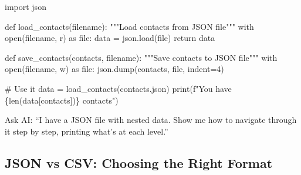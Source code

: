 \documentclass[
  letterpaper,
  DIV=11,
  numbers=noendperiod,
  oneside]{scrreprt}
\newenvironment{Shaded}{}{}
\newcommand{\BuiltInTok}[1]{\textcolor[rgb]{0.84,0.23,0.29}{#1}}
\newcommand{\CommentTok}[1]{\textcolor[rgb]{0.42,0.45,0.49}{#1}}
\newcommand{\ControlFlowTok}[1]{\textcolor[rgb]{0.84,0.23,0.29}{#1}}
\newcommand{\DecValTok}[1]{\textcolor[rgb]{0.00,0.36,0.77}{#1}}
\newcommand{\ImportTok}[1]{\textcolor[rgb]{0.01,0.18,0.38}{#1}}
\newcommand{\KeywordTok}[1]{\textcolor[rgb]{0.84,0.23,0.29}{#1}}
\newcommand{\NormalTok}[1]{\textcolor[rgb]{0.14,0.16,0.18}{#1}}
\newcommand{\OperatorTok}[1]{\textcolor[rgb]{0.14,0.16,0.18}{#1}}
\newcommand{\SpecialCharTok}[1]{\textcolor[rgb]{0.00,0.36,0.77}{#1}}
\newcommand{\SpecialStringTok}[1]{\textcolor[rgb]{0.01,0.18,0.38}{#1}}
\newcommand{\StringTok}[1]{\textcolor[rgb]{0.01,0.18,0.38}{#1}}
\begin{document}
\begin{Shaded}
\begin{Highlighting}[]
\ImportTok{import}\NormalTok{ json}

\KeywordTok{def}\NormalTok{ load\_contacts(filename):}
    \CommentTok{"""Load contacts from JSON file"""}
    \ControlFlowTok{with} \BuiltInTok{open}\NormalTok{(filename, }\StringTok{\textquotesingle{}r\textquotesingle{}}\NormalTok{) }\ImportTok{as} \BuiltInTok{file}\NormalTok{:}
\NormalTok{        data }\OperatorTok{=}\NormalTok{ json.load(}\BuiltInTok{file}\NormalTok{)}
    \ControlFlowTok{return}\NormalTok{ data}

\KeywordTok{def}\NormalTok{ save\_contacts(contacts, filename):}
    \CommentTok{"""Save contacts to JSON file"""}
    \ControlFlowTok{with} \BuiltInTok{open}\NormalTok{(filename, }\StringTok{\textquotesingle{}w\textquotesingle{}}\NormalTok{) }\ImportTok{as} \BuiltInTok{file}\NormalTok{:}
\NormalTok{        json.dump(contacts, }\BuiltInTok{file}\NormalTok{, indent}\OperatorTok{=}\DecValTok{4}\NormalTok{)}

\CommentTok{\# Use it}
\NormalTok{data }\OperatorTok{=}\NormalTok{ load\_contacts(}\StringTok{\textquotesingle{}contacts.json\textquotesingle{}}\NormalTok{)}
\BuiltInTok{print}\NormalTok{(}\SpecialStringTok{f"You have }\SpecialCharTok{\{}\BuiltInTok{len}\NormalTok{(data[}\StringTok{\textquotesingle{}contacts\textquotesingle{}}\NormalTok{])}\SpecialCharTok{\}}\SpecialStringTok{ contacts"}\NormalTok{)}
\end{Highlighting}
\end{Shaded}

\begin{tcolorbox}[enhanced jigsaw, opacityback=0, colback=white, colframe=quarto-callout-tip-color-frame, breakable, titlerule=0mm, coltitle=black, rightrule=.15mm, colbacktitle=quarto-callout-tip-color!10!white, left=2mm, bottomtitle=1mm, bottomrule=.15mm, title=\textcolor{quarto-callout-tip-color}{\faLightbulb}\hspace{0.5em}{AI Learning Pattern}, opacitybacktitle=0.6, toptitle=1mm, leftrule=.75mm, arc=.35mm, toprule=.15mm]

Ask AI: ``I have a JSON file with nested data. Show me how to navigate
through it step by step, printing what's at each level.''

\end{tcolorbox}

\subsection{JSON vs CSV: Choosing the Right
Format}\label{json-vs-csv-choosing-the-right-format}
\end{document}
